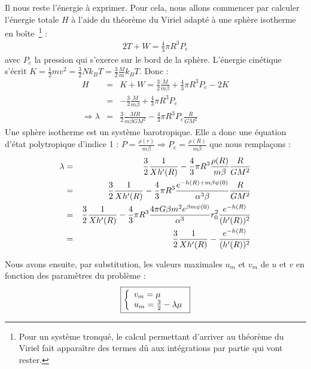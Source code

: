 	Il nous reste l'énergie à exprimer.
	Pour cela, nous allons commencer par calculer l'énergie totale $H$ à l'aide du théorème du Viriel adapté à une sphère isotherme en boîte~\footnote{Pour un système tronqué, le calcul permettant d'arriver au théorème du Viriel fait apparaître des termes dû aux intégrations par partie qui vont rester.} :
	\begin{eqnarray}
		2T + W = \frac{4}{3}\pi R^3 P_e
	\end{eqnarray}
	avec $P_e$ la pression qui s'exerce sur le bord de la sphère.
	L'énergie cinétique s'écrit \mbox{$K = \frac{1}{2}mv^2 = \frac{3}{2} N k_B T = \frac{3}{2} \frac{M}{m} k_B T$}.
	Donc :
	\begin{eqnarray*}
		H &=& K + W = \frac{3}{2} \frac{M}{m\beta} + \frac{4}{3}\pi R^3 P_e - 2K \\
		  &=& -\frac{3}{2} \frac{M}{m\beta} + \frac{4}{3}\pi R^3 P_e \\
		\Rightarrow \lambda &=& \frac{3}{2}\frac{MR}{m\beta GM^2} - \frac{4}{3}\pi R^3 P_e \frac{R}{GM^2}
	\end{eqnarray*}
	Une sphère isotherme est un système barotropique. Elle a donc une équation d'état polytropique d'indice 1 : $P = \frac{\rho(r)}{m\beta} \Rightarrow P_e = \frac{\rho(R)}{m\beta}$ que nous remplaçons :
	\begin{eqnarray}
		\lambda &=& \frac{3}{2}\frac{1}{Xh'(R)} - \frac{4}{3}\pi R^3 \frac{\rho(R)}{m\beta} \frac{R}{GM^2} \notag \\
			&=& \frac{3}{2}\frac{1}{Xh'(R)} - \frac{4}{3}\pi R^3 \frac{e^{-h(R) + m\beta\psi(0)}}{\alpha^3\beta} \frac{R}{GM^2} \notag \\
			&=& \frac{3}{2}\frac{1}{Xh'(R)} - \frac{4}{3}\pi R^3 \frac{4\pi G \beta m^2 e^{\beta m \psi(0)}}{\alpha^3} r_0^2\frac{e^{-h(R)}}{(h'(R))^2} \notag \\
			&=& \frac{3}{2}\frac{1}{Xh'(R)} - \frac{e^{-h(R)}}{(h'(R))^2}\label{lamum}
	\end{eqnarray}

	Nous avons ensuite, par substitution, les valeurs maximales $u_m$ et $v_m$ de $u$ et $v$ en fonction des paramètres du problème :
	\begin{eqnarray}
		\label{uv_max}
		\fbox{$
		\left\{\begin{array}{l}
			v_m = \mu \\
			u_m = \frac{3}{2} - \lambda \mu
		\end{array}\right.
		$}
	\end{eqnarray}

